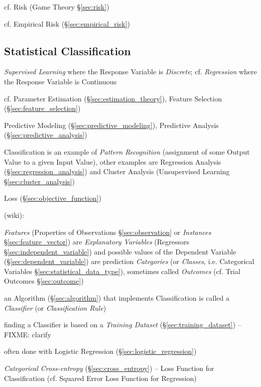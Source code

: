 \fist cf. Risk (Game Theory \S\ref{sec:risk})

cf. Empirical Risk (\S\ref{sec:empirical_risk})



\subsection{Statistical Classification}\label{sec:classification}

\emph{Supervised Learning} where the Response Variable is \emph{Discrete}; cf.
\emph{Regression} where the Response Variable is Continuous

cf. Parameter Estimation (\S\ref{sec:estimation_theory}), Feature Selection
(\S\ref{sec:feature_selection})

\fist Predictive Modeling (\S\ref{sec:predictive_modeling}), Predictive Analysis
(\S\ref{sec:predictive_analysis})

Classification is an example of \emph{Pattern Recognition} (assignment of some
Output Value to a given Input Value), other examples are Regression Analysis
(\S\ref{sec:regression_analysis}) and Cluster Analysis (Unsupervised Learning
\S\ref{sec:cluster_analysis})

Loss (\S\ref{sec:objective_function})

(wiki):

\emph{Features} (Properties of Observations \S\ref{sec:observation} or
\emph{Instances} \S\ref{sec:feature_vector}) are \emph{Explanatory Variables}
(Regressors \S\ref{sec:independent_variable}) and possible values of the
Dependent Variable (\S\ref{sec:dependent_variable}) are prediction
\emph{Categories} (or \emph{Classes}, i.e. Categorical Variables
\S\ref{sec:statistical_data_type}), sometimes called \emph{Outcomes} (cf. Trial
Outcomes \S\ref{sec:outcome})

an Algorithm (\S\ref{sec:algorithm}) that implements Classification is called a
\emph{Classifier} (or \emph{Classification Rule})

finding a Classifier is based on a \emph{Training Dataset}
(\S\ref{sec:training_dataset}) --FIXME: clarify

often done with Logistic Regression (\S\ref{sec:logistic_regression})

\emph{Categorical Cross-entropy} (\S\ref{sec:cross_entropy}) -- Loss Function
for Classification (cf. Squared Error Loss Function for Regression)

